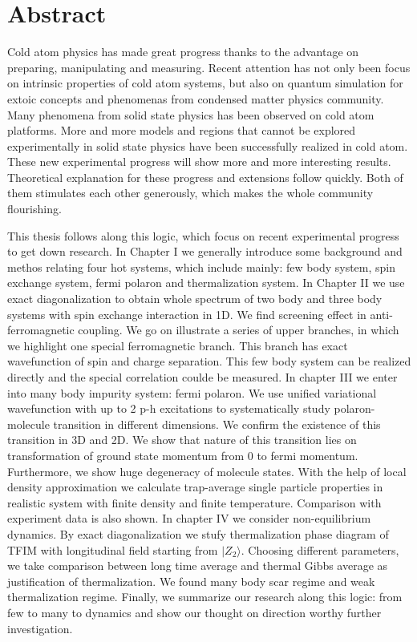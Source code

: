 \intobmk\chapter*{Abstract}%

Cold atom physics has made great progress thanks to the advantage on preparing, manipulating and measuring. Recent attention has not only been focus on intrinsic properties of cold atom systems, but also on quantum simulation for extoic concepts and phenomenas from condensed matter physics community. Many phenomena from solid state physics has been observed on cold atom platforms. More and more models and regions that cannot be explored experimentally in solid state physics have been successfully realized in cold atom. These new experimental progress will show more and more interesting results. Theoretical explanation for these progress and extensions follow quickly. Both of them stimulates each other generously, which makes the whole community flourishing.

This thesis follows along this logic, which focus on recent experimental progress to get down research. In Chapter I we generally introduce some background and methos relating four hot systems, which include mainly: few body system, spin exchange system, fermi polaron and thermalization system. In Chapter II we use exact diagonalization to obtain whole spectrum of two body and three body systems with spin exchange interaction in 1D. We find screening effect in anti-ferromagnetic coupling. We go on illustrate a series of upper branches, in which we highlight one special ferromagnetic branch. This branch has exact wavefunction of spin and charge separation. This few body system can be realized directly and the special correlation coulde be measured. In chapter III we enter into many body impurity system: fermi polaron. We use unified variational wavefunction with up to 2 p-h excitations to systematically study polaron-molecule transition in different dimensions. We confirm the existence of this transition in 3D and 2D. We show that nature of this transition lies on transformation of ground state momentum from 0 to fermi momentum. Furthermore, we show huge degeneracy of molecule states. With the help of local density approximation we calculate trap-average single particle properties in realistic system with finite density and finite temperature. Comparison with experiment data is also shown. In chapter IV we consider non-equilibrium dynamics. By exact diagonalization we stufy thermalization phase diagram of TFIM with longitudinal field starting from $|Z_2\rangle$. Choosing different parameters, we take comparison between long time average and thermal Gibbs average as justification of thermalization. We found many body scar regime and weak thermalization regime. Finally, we summarize our research along this logic: from few to many to dynamics and show our thought on direction worthy further investigation.

